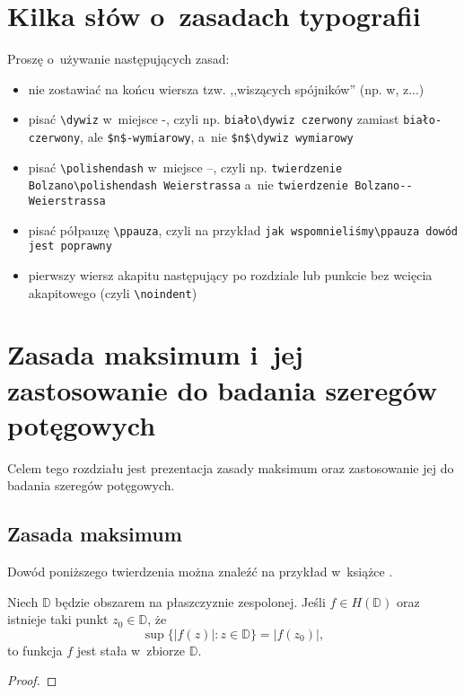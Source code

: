 \section{Kilka słów o~zasadach typografii}

\noindent Proszę o~używanie następujących zasad:
{\raggedright
\begin{itemize}
\item nie zostawiać na końcu wiersza tzw. ,,wiszących spójników''
  (np. w, z...)
\item pisać \verb|\dywiz| w~miejsce -, czyli np.
  \verb|biało\dywiz czerwony| zamiast \verb|biało-czerwony|, ale
  \verb|$n$-wymiarowy|, a~nie \verb|$n$\dywiz wymiarowy|
\item pisać \verb|\polishendash| w~miejsce --, czyli
  np. \verb|twierdzenie Bolzano\polishendash Weierstrassa| a~nie
  \verb|twierdzenie Bolzano--Weierstrassa|
\item pisać półpauzę \verb|\ppauza|, czyli na przykład
  \verb|jak wspomnieliśmy\ppauza dowód jest poprawny|
\item pierwszy wiersz akapitu następujący po rozdziale lub punkcie bez
  wcięcia akapitowego (czyli \verb|\noindent|)
\end{itemize}\par}


\section{Zasada maksimum i~jej zastosowanie do badania szeregów
  potęgowych}

\noindent Celem tego rozdziału jest prezentacja zasady maksimum oraz
zastosowanie jej do badania szeregów potęgowych.

\subsection{Zasada maksimum}

\noindent Dowód poniższego twierdzenia można znaleźć na przykład
w~książce \cite{complex}.
\begin{theorem}\label{tw-1}
  Niech $\mathbb{D}$ będzie obszarem na płaszczyznie zespolonej.
  Jeśli $f\in H(\mathbb{D})$ oraz istnieje taki punkt
  $z_0\in\mathbb{D}$, że
  \[
  \sup \bigl\{|f(z)| : z\in\mathbb{D}\bigr\} =|f(z_0)|,
  \]
  to funkcja $f$ jest stała w~zbiorze $\mathbb{D}$.
\end{theorem}

\begin{proof}
\lipsum[1-4]
\end{proof}

